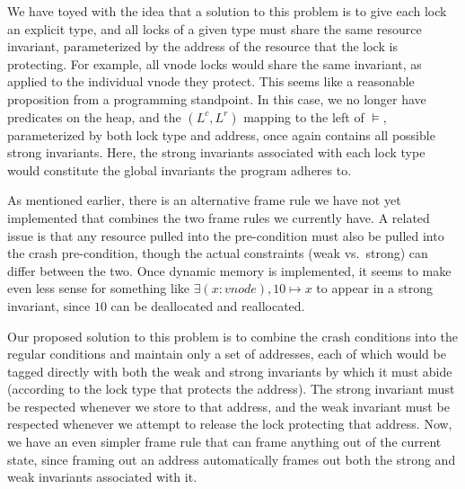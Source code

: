 We have toyed with the idea that a solution to this problem is to give each lock
an explicit type, and all locks of a given type must share the same resource
invariant, parameterized by the address of the resource that the lock is
protecting.
For example, all vnode locks would share the same invariant, as
applied to the individual vnode they protect.
This seems like a reasonable proposition from a programming standpoint.
In this case, we no longer have predicates on the heap, and the
$(L^c,L^r)$ mapping to the left of $\vDash$, parameterized by both lock type and
address, once again contains all possible strong invariants.
Here, the strong
invariants associated with each lock type would constitute the global invariants
the program adheres to.

As mentioned earlier, there is an alternative frame rule we have not
yet implemented that combines the two
frame rules we currently have.
A related
issue is that any resource pulled into the pre-condition must also be pulled
into the crash pre-condition, though the actual constraints (weak vs.\ strong)
can differ between the two.
Once dynamic memory is implemented, it seems to make
even less sense for something like $\exists (x:vnode), 10\mapsto x$ to appear in
a strong invariant, since $10$ can be deallocated and reallocated.

Our proposed solution to this problem is to combine the crash conditions into
the regular conditions and maintain only a set of addresses, each of which
would be tagged directly with both the weak and strong invariants by which it
must abide (according to the lock type that protects the address).
The strong
invariant must be respected whenever we store
to that address, and the weak invariant must be respected whenever we attempt to
release the lock protecting that address.
Now, we have an even simpler frame
rule that can frame anything out of the current state, since framing out an
address automatically frames out both the strong and weak invariants associated
with it.

%

